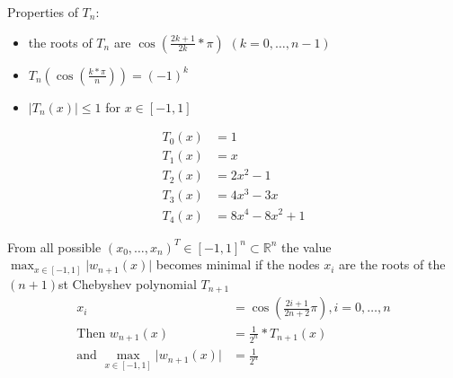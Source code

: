 Properties of $T_n$:
\begin{itemize}
    \item the roots of $T_n$ are $\cos(\frac{2k+1}{2k}*\pi)$ $(k=0,\ldots, n-1)$
    \item $T_n\left(\cos(\frac{k*\pi}{n})\right)= (-1)^k$
    \item $\lvert T_n(x) \rvert \leq 1$ for $x \in [-1,1]$
\end{itemize}
\begin{align*}
    T_0(x) &= 1\\
    T_1(x) &= x\\
    T_2(x) &= 2x^2-1\\
    T_3(x) &= 4x^{3}-3x\\
    T_4(x) &= 8x^4-8x^2+1
\end{align*}
\begin{theorem}
    From all possible $(x_0, \ldots, x_n)^T \in [-1,1]^n \subset \mathbb{R}^n$ the value $\max_{x \in [-1,1]} \lvert w_{n+1}(x) \rvert$ becomes minimal if the nodes $x_i$ are
    the roots of the $(n+1)$st Chebyshev polynomial $T_{n+1}$
    \begin{align*}
        x_i &= \cos\left(\frac{2i+1}{2n+2} \pi\right), i=0,\ldots,n\\
        \text{Then } w_{n+1}(x) &= \frac{1}{2^n}* T_{n+1}(x) \\
        \text{and } \max_{x \in [-1,1]} \lvert w_{n+1}(x) \rvert &= \frac{1}{2^n}
    \end{align*}
\end{theorem}

